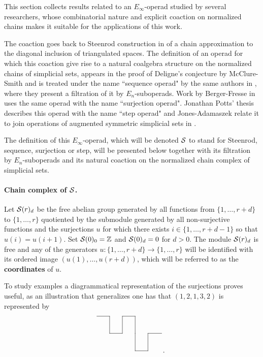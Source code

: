 \documentclass[main.tex]{subfiles}
\begin{document}
This section collects results related to an $E_\infty$-operad studied by several researchers, whose combinatorial nature and explicit coaction on normalized chains makes it suitable for the applications of this work.

The coaction goes back to Steenrod construction in \cite{Ste47} of a chain approximation to the diagonal inclusion of triangulated spaces. The definition of an operad for which this coaction give rise to a natural coalgebra structure on the normalized chains of simplicial sets, appears in the proof of Deligne's conjecture by McClure-Smith \cite{MS02} and is treated under the name ``sequence operad" by the same authors in \cite{MS03}, where they present a filtration of it by $E_n$-suboperads. Work by Berger-Fresse in \cite{BF04} uses the same operad with the name ``surjection operad". Jonathan Potts' thesis \cite{Pot06} describes this operad with the name ``step operad" and Jones-Adamaszek relate it to join operations of augmented symmetric simplicial sets in \cite{AJ11}.

The definition of this $E_\infty$-operad, which will be denoted $\S$ to stand for Steenrod, sequence, surjection or step, will be presented below together with its filtration by $E_n$-suboperads and its natural coaction on the normalized chain complex of simplicial sets.

\paragraph{Chain complex of $\S$.} Let $\S(r)_d$ be the free abelian group generated by all functions from $\{1,\dotsc,r+d\}$ to $\{1,\dotsc,r\}$ quotiented by the submodule generated by all non-surjective functions and the surjections $u$ for which there exists $i\in\{1,\dotsc,r+d-1\}$ so that $u(i)=u(i+1)$. Set $\S(0)_0=\Z$ and $\S(0)_d=0$ for $d>0$. The module $\S(r)_d$ is free and any of the generators $u:\{1,\dotsc,r+d\}\to\{1,\dotsc,r\}$ will be identified with its ordered image $(u(1),\dotsc,u(r+d))$, which will be referred to as the \textbf{coordinates} of $u$.

To study examples a diagrammatical representation of the surjections proves useful, as an illustration that generalizes one has that $(1,2,1,3,2)$ is represented by
$$\xymatrix@C=1.5pc@R=1.5pc{
\t \ar@{-}[r]& \t\ar@{-}[d] &\t \ar@{-}[r]&\t \ar@{-}[d]& \t &  \\
\t &\t \ar@{-}[r]&\t \ar@{-}[u]&\t \ar@{-}[d]&\t \ar@{-}[r]&  \\
\t &\t &\t &\t \ar@{-}[r]& \t\ar@{-}[u]& . }$$
\end{document}

